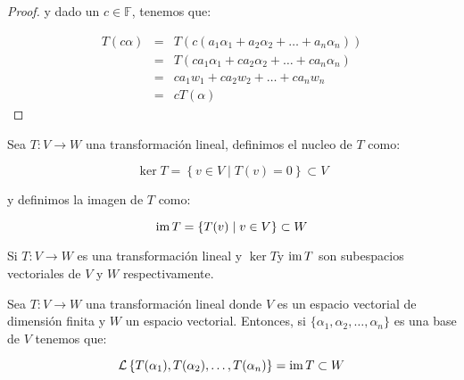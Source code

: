 \begin{proof}
			y dado un $c \in \mathbb{F}$, tenemos que:

			\begin{eqnarray*}
				T(c \alpha) & = & T(c (a_1 \alpha_1 + a_2 \alpha_2 + \dots + a_n \alpha_n)) \\
				& = & T(c a_1 \alpha_1 + c a_2 \alpha_2 + \dots + c a_n \alpha_n) \\
				& = & c a_1 w_1 + c a_2 w_2 + \dots + c a_n w_n \\
				& = & c T(\alpha)
			\end{eqnarray*}
		\end{proof}

		\begin{definicion}
			Sea $T \colon V \to W$ una transformación lineal, definimos el nucleo de $T$ como:

			\begin{equation}
				\ker{T} = \left\{ v \in V \mid T(v) = 0 \right\} \subset V
			\end{equation}

			y definimos la imagen de $T$ como:

			\begin{equation}
				\operatorname{im}{T} = \left\{ T(v) \mid v \in V \right\} \subset W
			\end{equation}
		\end{definicion}

		\begin{proposicion}
			Si $T \colon V \to W$ es una transformación lineal y $\ker{T}$y $\operatorname{im}{T}$ son subespacios vectoriales de $V$ y $W$ respectivamente.
		\end{proposicion}

		\begin{proposicion}
			Sea $T \colon V \to W$ una transformación lineal donde $V$ es un espacio vectorial de dimensión finita y $W$ un espacio vectorial.
			Entonces, si $\{ \alpha_1, \alpha_2, \dots, \alpha_n \}$ es una base de $V$ tenemos que:

			\begin{equation}
				\mathcal{L} \left\{ T(\alpha_1), T(\alpha_2), \dots, T(\alpha_n) \right\} = \operatorname{im}{T} \subset W
			\end{equation}
		\end{proposicion}

